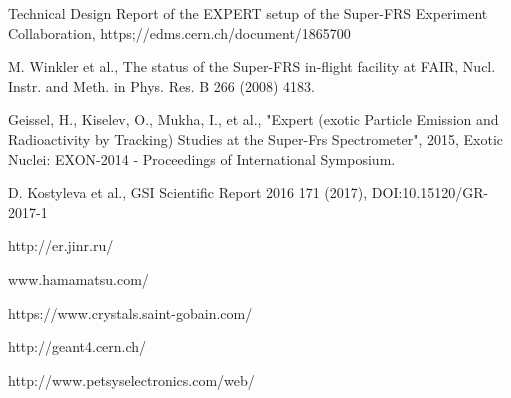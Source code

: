 \documentclass{webofc}
\begin{document}
	
\begin{thebibliography}{99}
	
	Technical Design Report of the EXPERT setup of the Super-FRS Experiment Collaboration, https;//edms.cern.ch/document/1865700
	
	M. Winkler et al., The status of the Super-FRS in-flight facility at FAIR, Nucl. Instr. and Meth. in Phys. Res. B 266 (2008) 4183.
	
	Geissel, H., Kiselev, O., Mukha, I., et al., "Expert (exotic Particle Emission and Radioactivity by Tracking) Studies at the Super-Frs Spectrometer", 2015, Exotic Nuclei: EXON-2014 - Proceedings of International Symposium.
	
	D. Kostyleva et al., GSI Scientific Report 2016 171 (2017), DOI:10.15120/GR-2017-1
	
	http://er.jinr.ru/
	
	www.hamamatsu.com/
	
	https://www.crystals.saint-gobain.com/
	
	http://geant4.cern.ch/
	
	http://www.petsyselectronics.com/web/
	
\end{thebibliography}
\end{document}
